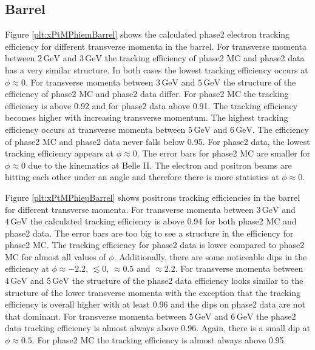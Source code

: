 \documentclass[a4paper,11pt,twosided,final,german,openbib,pdftex,listof=totoc,bibliography=totoc]{scrbook}
\begin{document}
\newpage



\subsection{Barrel}

Figure \ref{plt:xPtMPhiemBarrel} shows the calculated phase2 electron tracking efficiency for different transverse momenta in the barrel. For transverse momenta between $2\,\textrm{GeV}$ and $3\,\textrm{GeV}$ the tracking efficiency of phase2 MC and phase2 data has a very similar structure. In both cases the lowest tracking efficiency occurs at $\phi \approx 0$. 
For transverse momenta between $3\,\textrm{GeV}$ and $5\,\textrm{GeV}$ the structure of the efficiency of phase2 MC and phase2 data differ. For phase2 MC the tracking efficiency is above 0.92 and for phase2 data above 0.91. The tracking efficiency becomes higher with increasing transverse momentum. The highest tracking efficiency occurs at transverse momenta between $5\,\textrm{GeV}$ and $6\,\textrm{GeV}$. The efficiency of phase2 MC and phase2 data never falls below 0.95. 
For phase2 data, the lowest tracking efficiency appears at $\phi \approx 0$. The error bars for phase2 MC are smaller for $\phi \approx 0$ due to the kinematics at Belle II. The electron and positron beams are hitting each other under an angle and therefore there is more statistics at $\phi \approx 0$.


Figure \ref{plt:xPtMPhiepBarrel} shows positrons tracking efficiencies in the barrel for different transverse momenta. 
For transverse momenta between $3\,\textrm{GeV}$ and $4\,\textrm{GeV}$ the calculated tracking efficiency is above 0.94 for both phase2 MC and phase2 data. The error bars are too big to see a structure in the efficiency for phase2 MC. The tracking efficiency for phase2 data is lower compared to phase2 MC for almost all values of $\phi$. Additionally, there are some noticeable dips in the efficiency at $\phi \approx -2.2$, $ \lesssim 0$, $ \approx 0.5$ and $ \approx 2.2$. 
For transverse momenta between $4\,\textrm{GeV}$ and $5\,\textrm{GeV}$ the structure of the phase2 data efficiency looks similar to the structure of the lower transverse momenta with the exception that the tracking efficiency is overall higher with at least 0.96 and the dips on phase2 data are not that dominant. 
For transverse momenta between $5\,\textrm{GeV}$ and $6\,\textrm{GeV}$ the phase2 data tracking efficiency is almost always above 0.96. Again, there is a small dip at $\phi \approx 0.5$. For phase2 MC the tracking efficiency is almost always above 0.95. 
\end{document}
